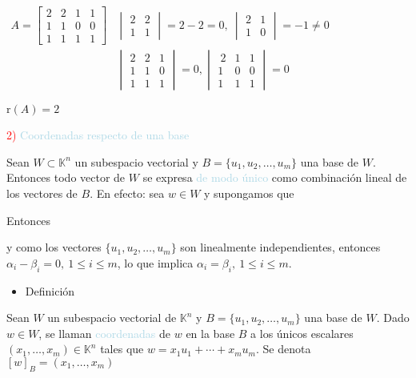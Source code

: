 \documentclass[12pt]{article}
\begin{document}
$\begin{array}{ll}
A=\begin{bmatrix}
2 & 2 & 1 & 1 \\ 
1 & 1 & 0 & 0 \\ 
1 & 1 & 1 & 1
\end{bmatrix} & \begin{vmatrix}
2 & 2 \\ 
1 & 1
\end{vmatrix}=2-2=0,~\begin{vmatrix}
2 & 1 \\ 
1 & 0
\end{vmatrix}=-1\neq0\\
& \begin{vmatrix}
2 & 2 & 1 \\ 
1 & 1 & 0 \\ 
1 & 1 & 1
\end{vmatrix} =0,\begin{vmatrix}
~2 & 1 & 1 \\ 
1 & 0 & 0 \\ 
1 & 1 & 1
\end{vmatrix}=0 
\end{array}$

$\mathrm{r}(A)=2$

\textcolor{red}{2) }\textcolor{lightblue}{Coordenadas respecto de una base}

Sean $W\subset\mathbb{K}^n$ un subespacio vectorial y $B=\{u_{1},u_{2},\hdots,u_m\}$ una base de $W$. Entonces todo vector de $W$ se expresa \textcolor{lightblue}{de modo único} como combinación lineal de los vectores de $B$. En efecto: sea $w\in W$ y supongamos que \begin{center}
\end{center}
Entonces \begin{center}
\end{center}
y como los vectores $\{u_{1},u_{2},\hdots,u_m\}$ son linealmente independientes, entonces $\alpha_i-\beta_i=0,~1\le i\le m$, lo que implica $\alpha_i=\beta_i,~1\le i\le m$.
\begin{itemize}[label=\color{red}\textbullet, leftmargin=*]
    \item \color{lightblue}Definición
\end{itemize}
Sean $W$ un subespacio vectorial de $\mathbb{K}^n$ y $B=\{u_{1},u_{2},\hdots,u_m\}$ una base de $W$. Dado $w\in W$, se llaman \textcolor{lightblue}{coordenadas} de $w$ en la base $B$ a los únicos escalares $(x_{1},\hdots,x_m)\in\mathbb{K}^n$ tales que $w=x_1u_{1}+\cdots+x_mu_m$. Se denota $[w]_{B}=(x_{1},\hdots,x_m)$
\end{document}
